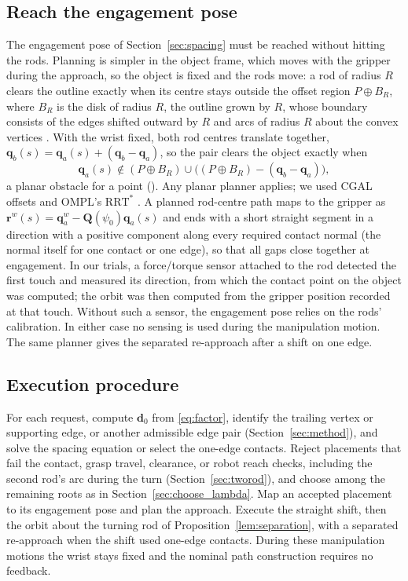 \subsection{Reach the engagement pose}
\label{sec:approach}
The engagement pose of Section~\ref{sec:spacing} must be reached without hitting the rods. Planning is simpler in the object frame, which moves with the gripper during the approach, so the object is fixed and the rods move: a rod of radius $R$ clears the outline exactly when its centre stays outside the offset region $P\oplus B_R$, where $B_R$ is the disk of radius $R$, the outline grown by $R$, whose boundary consists of the edges shifted outward by $R$ and arcs of radius $R$ about the convex vertices \cite{wein2007exact}. With the wrist fixed, both rod centres translate together, $\mathbf q_b(s)=\mathbf q_a(s)+(\mathbf q_b-\mathbf q_a)$, so the pair clears the object exactly when
\begin{equation}
  \mathbf q_a(s)\notin(P\oplus B_R)\cup\bigl((P\oplus B_R)-(\mathbf q_b-\mathbf q_a)\bigr),
  \label{eq:cobs}
\end{equation}
a planar obstacle for a point (). Any planar planner applies; we used CGAL offsets \cite{fabri2009cgal} and OMPL's $\mathrm{RRT}^{*}$ \cite{sucan2012open}. A planned rod-centre path maps to the gripper as $\mathbf r^w(s)=\mathbf q_a^w-\mathbf Q(\psi_0)\mathbf q_a(s)$ and ends with a short straight segment in a direction with a positive component along every required contact normal (the normal itself for one contact or one edge), so that all gaps close together at engagement. In our trials, a force/torque sensor attached to the rod detected the first touch and measured its direction, from which the contact point on the object was computed; the orbit was then computed from the gripper position recorded at that touch. Without such a sensor, the engagement pose relies on the rods' calibration. In either case no sensing is used during the manipulation motion. The same planner gives the separated re-approach after a shift on one edge.



\subsection{Execution procedure}
\label{sec:execution}
For each request, compute $\mathbf d_0$ from \eqref{eq:factor}, identify the trailing vertex or supporting edge, or another admissible edge pair (Section~\ref{sec:method}), and solve the spacing equation or select the one-edge contacts. Reject placements that fail the contact, grasp travel, clearance, or robot reach checks, including the second rod's arc during the turn (Section~\ref{sec:tworod}), and choose among the remaining roots as in Section~\ref{sec:choose_lambda}. Map an accepted placement to its engagement pose and plan the approach. Execute the straight shift, then the orbit about the turning rod of Proposition~\ref{lem:separation}, with a separated re-approach when the shift used one-edge contacts. During these manipulation motions the wrist stays fixed and the nominal path construction requires no feedback.
